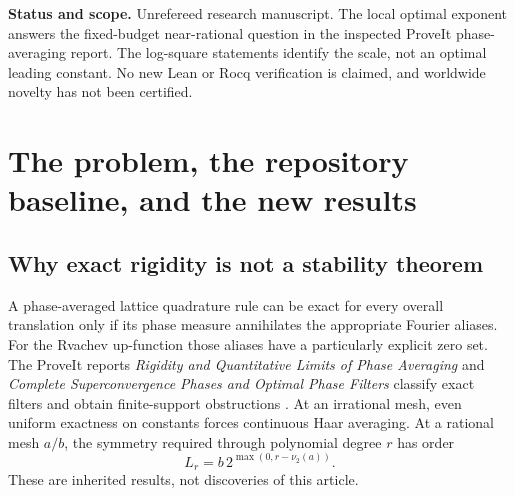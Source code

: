 \documentclass[11pt,a4paper]{article}
\numberwithin{equation}{section}
\theoremstyle{plain}
\theoremstyle{definition}
\theoremstyle{remark}
\begin{document}
\begin{titlepage}
\begin{minipage}{0.94\textwidth}
\begin{abstract}
For an irrational mesh satisfying a finite-type Diophantine lower bound, the
optimal positive $N$-phase error is $\exp[-\Theta((\log N)^2)]$. Equivalently,
accuracy $\varepsilon$ requires $\exp[\Theta(\sqrt{\log(1/\varepsilon)})]$
phases. We also obtain a finite-frequency Wasserstein inversion inequality.
It yields a matching stretched-logarithmic scale of approximate Haar rigidity,
while excluding every local H\"older inverse estimate. Finally, specially
constructed Liouville meshes permit arbitrarily small errors along prescribed
subsequences and arbitrarily slow inverse moduli. All results have ordinary
proofs; the package includes exact arithmetic checks and numerical diagnostics.
\end{abstract}
\end{minipage}
\vfill
\begin{minipage}{0.94\textwidth}\small
\textbf{Status and scope.} Unrefereed research manuscript. The local optimal
exponent answers the fixed-budget near-rational question in the inspected
ProveIt phase-averaging report. The log-square statements identify the scale,
not an optimal leading constant. No new Lean or Rocq verification is claimed,
and worldwide novelty has not been certified.
\end{minipage}
\end{titlepage}
\hypersetup{pageanchor=true}
\begingroup\small\setlength{\parskip}{0pt}\tableofcontents\endgroup
\newpage

\section{The problem, the repository baseline, and the new results}
\label{sec:intro}

\subsection{Why exact rigidity is not a stability theorem}

A phase-averaged lattice quadrature rule can be exact for every overall
translation only if its phase measure annihilates the appropriate Fourier
aliases. For the Rvachev up-function those aliases have a particularly explicit
zero set. The ProveIt reports \emph{Rigidity and Quantitative Limits of Phase
Averaging} and \emph{Complete Superconvergence Phases and Optimal Phase Filters}
classify exact filters and obtain finite-support obstructions
\cite{repoRigidity,repoFilters}. At an irrational mesh, even uniform exactness
on constants forces continuous Haar averaging. At a rational mesh $a/b$, the
symmetry required through polynomial degree $r$ has order
\begin{equation}\label{eq:oldthreshold}
 L_r=b\,2^{\max(0,r-\nu_2(a))}.
\end{equation}
These are inherited results, not discoveries of this article.
\end{document}
